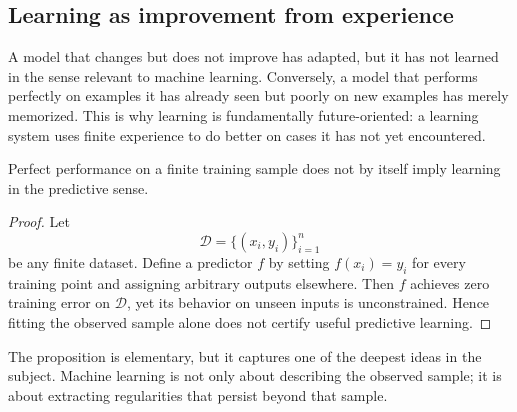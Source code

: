 \subsection*{Learning as improvement from experience}

A model that changes but does not improve has adapted, but it has not learned in the sense relevant to machine learning. Conversely, a model that performs perfectly on examples it has already seen but poorly on new examples has merely memorized. This is why learning is fundamentally future-oriented: a learning system uses finite experience to do better on cases it has not yet encountered.

\begin{proposition}
Perfect performance on a finite training sample does not by itself imply learning in the predictive sense.
\end{proposition}

\begin{proof}
Let
\[
\mathcal D=\{(x_i,y_i)\}_{i=1}^n
\]
be any finite dataset. Define a predictor $f$ by setting $f(x_i)=y_i$ for every training point and assigning arbitrary outputs elsewhere. Then $f$ achieves zero training error on $\mathcal D$, yet its behavior on unseen inputs is unconstrained. Hence fitting the observed sample alone does not certify useful predictive learning.
\end{proof}

The proposition is elementary, but it captures one of the deepest ideas in the subject. Machine learning is not only about describing the observed sample; it is about extracting regularities that persist beyond that sample.

